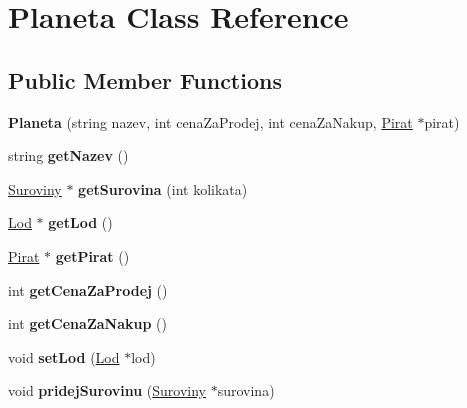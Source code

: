 \hypertarget{class_planeta}{}\section{Planeta Class Reference}
\label{class_planeta}
\subsection*{Public Member Functions}
\begin{DoxyCompactItemize}
\item 
\mbox{\label{class_planeta_a986261fdd4028ffb72f19e3adb03d244}} 
{\bfseries Planeta} (string nazev, int cena\+Za\+Prodej, int cena\+Za\+Nakup, \hyperlink{class_pirat}{Pirat} $\ast$pirat)
\item 
\mbox{\label{class_planeta_a1b8778d99a9e6e102b7af3b9411494d7}} 
string {\bfseries get\+Nazev} ()
\item 
\mbox{\label{class_planeta_ad6e87052013c2013f765e7914850743a}} 
\hyperlink{class_suroviny}{Suroviny} $\ast$ {\bfseries get\+Surovina} (int kolikata)
\item 
\mbox{\label{class_planeta_a322fc8b1673aa32921db8794ded212b9}} 
\hyperlink{class_lod}{Lod} $\ast$ {\bfseries get\+Lod} ()
\item 
\mbox{\label{class_planeta_af53f32a0b7af3d8f6a1094d57e469bda}} 
\hyperlink{class_pirat}{Pirat} $\ast$ {\bfseries get\+Pirat} ()
\item 
\mbox{\label{class_planeta_af3757b4e848ce39dbb842d7a750ae5b1}} 
int {\bfseries get\+Cena\+Za\+Prodej} ()
\item 
\mbox{\label{class_planeta_abf036d0bf62d574d7d4def69a3668652}} 
int {\bfseries get\+Cena\+Za\+Nakup} ()
\item 
\mbox{\label{class_planeta_a3479d0ede2fdaf3d8912de2b95b22d14}} 
void {\bfseries set\+Lod} (\hyperlink{class_lod}{Lod} $\ast$lod)
\item 
\mbox{\label{class_planeta_a3923b1840a785226d82e1057bd9ab6f3}} 
void {\bfseries pridej\+Surovinu} (\hyperlink{class_suroviny}{Suroviny} $\ast$surovina)

\end{DoxyCompactItemize}
